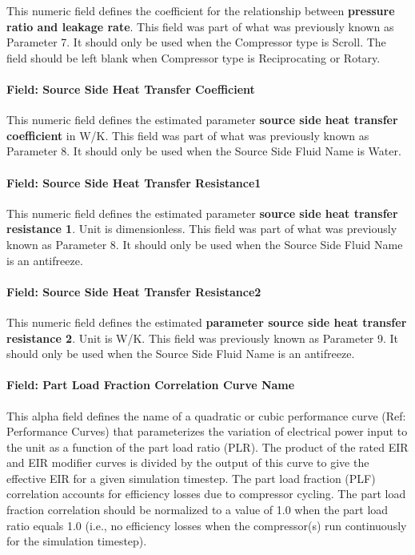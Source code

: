 This numeric field defines the coefficient for the relationship between \textbf{pressure ratio and leakage rate}. This field was part of what was previously known as Parameter 7. It should only be used when the Compressor type is Scroll. The field should be left blank when Compressor type is Reciprocating or Rotary.

\paragraph{Field: Source Side Heat Transfer Coefficient}\label{field-source-side-heat-transfer-coefficient-1}

This numeric field defines the estimated parameter \textbf{source side heat transfer coefficient} in W/K. This field was part of what was previously known as Parameter 8. It should only be used when the Source Side Fluid Name is Water.

\paragraph{Field: Source Side Heat Transfer Resistance1}\label{field-source-side-heat-transfer-resistance1-1}

This numeric field defines the estimated parameter \textbf{source side heat transfer resistance 1}. Unit is dimensionless. This field was part of what was previously known as Parameter 8. It should only be used when the Source Side Fluid Name is an antifreeze.

\paragraph{Field: Source Side Heat Transfer Resistance2}\label{field-source-side-heat-transfer-resistance2-1}

This numeric field defines the estimated \textbf{parameter source side heat transfer resistance 2}. Unit is W/K. This field was previously known as Parameter 9. It should only be used when the Source Side Fluid Name is an antifreeze.

\paragraph{Field: Part Load Fraction Correlation Curve Name}\label{field-part-load-fraction-correlation-curve-name-peh}

This alpha field defines the name of a quadratic or cubic performance curve (Ref: Performance Curves) that parameterizes the variation of electrical power input to the unit as a function of the part load ratio (PLR). The product of the rated EIR and EIR modifier curves is divided by the output of this curve to give the effective EIR for a given simulation timestep. The part load fraction (PLF) correlation accounts for efficiency losses due to compressor cycling. The part load fraction correlation should be normalized to a value of 1.0 when the part load ratio equals 1.0 (i.e., no efficiency losses when the compressor(s) run continuously for the simulation timestep).

